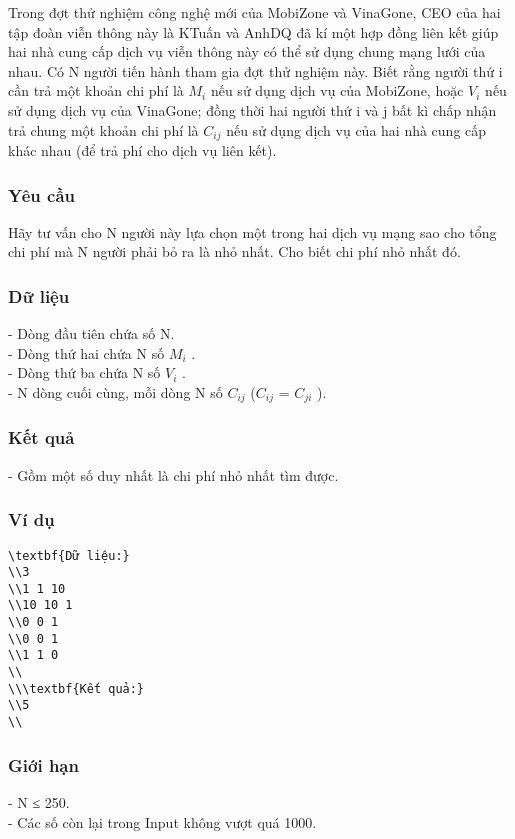 







   Trong đợt thử nghiệm công nghệ mới của MobiZone và VinaGone, CEO của hai tập đoàn viễn thông này là KTuấn và AnhDQ đã kí một hợp đồng liên kết giúp hai nhà cung cấp dịch vụ viễn thông này có thể sử dụng chung mạng lưới của nhau. Có N người tiến hành tham gia đợt thử nghiệm này. Biết rằng người thứ i cần trả một khoản chi phí là $M_{i}$   nếu sử dụng dịch vụ của MobiZone, hoặc $V_{i}$   nếu sử dụng dịch vụ của VinaGone; đồng thời hai người thứ i và j bất kì chấp nhận trả chung một khoản chi phí là $C_{ij}$   nếu sử dụng dịch vụ của hai nhà cung cấp khác nhau (để trả phí cho dịch vụ liên kết).  

\subsubsection{   Yêu cầu  }

   Hãy tư vấn cho N người này lựa chọn một trong hai dịch vụ mạng sao cho tổng chi phí mà N người phải bỏ ra là nhỏ nhất. Cho biết chi phí nhỏ nhất đó.  

\subsubsection{   Dữ liệu  }

   - Dòng đầu tiên chứa số N.   
\\   - Dòng thứ hai chứa N số $M_{i}$   .   
\\   - Dòng thứ ba chứa N số $V_{i}$   .   
\\   - N dòng cuối cùng, mỗi dòng N số $C_{ij}$   ($C_{ij}$   = $C_{ji}$   ).  

\subsubsection{   Kết quả  }

   - Gồm một số duy nhất là chi phí nhỏ nhất tìm được.  

\subsubsection{   Ví dụ  }
\begin{verbatim}
\textbf{Dữ liệu:}
\\3
\\1 1 10
\\10 10 1
\\0 0 1
\\0 0 1
\\1 1 0
\\
\\\textbf{Kết quả:}
\\5
\\\end{verbatim}

\subsubsection{   Giới hạn  }

   - N ≤ 250.   
\\   - Các số còn lại trong Input không vượt quá 1000.  

